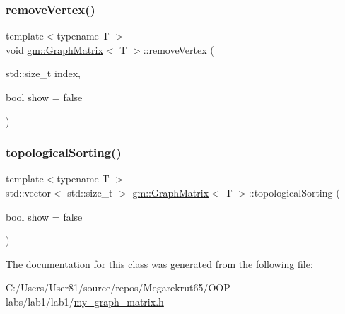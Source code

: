 \mbox{\label{classgm_1_1_graph_matrix_a43883f2cb97bc0286809be6fc8972838}} 
\subsubsection{\texorpdfstring{remove\+Vertex()}{removeVertex()}}
{\footnotesize\ttfamily template$<$typename T $>$ \\
void \mbox{\hyperlink{classgm_1_1_graph_matrix}{gm\+::\+Graph\+Matrix}}$<$ T $>$\+::remove\+Vertex (\begin{DoxyParamCaption}\item[{std\+::size\+\_\+t}]{index,  }\item[{bool}]{show = {\ttfamily false} }\end{DoxyParamCaption})}

\mbox{\label{classgm_1_1_graph_matrix_a8f88b6ebce9cc1ed403d414cd173da02}} 
\subsubsection{\texorpdfstring{topological\+Sorting()}{topologicalSorting()}}
{\footnotesize\ttfamily template$<$typename T $>$ \\
std\+::vector$<$ std\+::size\+\_\+t $>$ \mbox{\hyperlink{classgm_1_1_graph_matrix}{gm\+::\+Graph\+Matrix}}$<$ T $>$\+::topological\+Sorting (\begin{DoxyParamCaption}\item[{bool}]{show = {\ttfamily false} }\end{DoxyParamCaption})}



The documentation for this class was generated from the following file\+:\begin{DoxyCompactItemize}
\item 
C\+:/\+Users/\+User81/source/repos/\+Megarekrut65/\+O\+O\+P-\/labs/lab1/lab1/\mbox{\hyperlink{my__graph__matrix_8h}{my\+\_\+graph\+\_\+matrix.\+h}}\end{DoxyCompactItemize}
